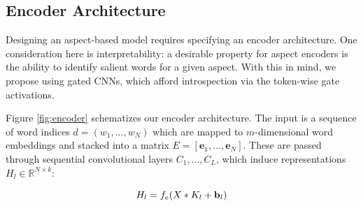 \documentclass[11pt,a4paper]{article}
\begin{document}





\vspace{-.25em}
\subsection{Encoder Architecture}
\label{section:encoder}
\vspace{-.25em}

Designing an aspect-based model requires specifying an encoder architecture. One consideration here is interpretability: a desirable property for aspect encoders is the ability to identify salient words for a given aspect. With this in mind, we propose using gated CNNs, which afford introspection via the token-wise gate activations. 

Figure \ref{fig:encoder} schematizes our encoder architecture. The input is a sequence of word indices $d = (w_{1}, ..., w_{N})$ which are mapped to $m$-dimensional word embeddings and stacked into a matrix $E = [{\mathbf e}_1, ..., {\mathbf e}_N]$. These are passed through sequential convolutional layers $C_1, ..., C_L$, which induce representations $H_l \in \mathbb{R}^{N \times k}$:

\vspace{-.5em}
\begin{equation}
\vspace{-.2em}
H_l = f_e(X * K_l + {\mathbf b_l})
\end{equation}
\end{document}
